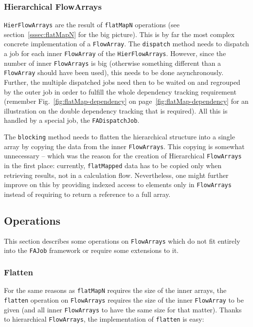 \documentclass[runningheads,a4paper,fleqn]{llncs}
\begin{document}
\subsubsection{Hierarchical FlowArrays}
\texttt{HierFlowArrays} are the result of \texttt{flatMapN} operations
(see section~\ref{sssec:flatMapN} for the big picture). This is by far
the most complex concrete implementation of a \texttt{FlowArray}. The
\texttt{dispatch} method needs to dispatch a job for each inner
\texttt{FlowArray} of the \texttt{HierFlowArrays}. However, since the number of
inner \texttt{FlowArrays} is big (otherwise something different than a \texttt{FlowArray}
should have been used), 
this needs to be done asynchronously. Further, the multiple dispatched
jobs need then to be waited on and regrouped by the outer job in order
to fulfill the whole dependency tracking requirement (remember
Fig.~\ref{fig:flatMap-dependency} on
page~\ref{fig:flatMap-dependency} for an illustration on the
double dependency tracking that is required). All this is handled by a 
special job, the \texttt{FADispatchJob}.

The \texttt{blocking} method needs to flatten the hierarchical
structure into a single array by copying the data from the inner
\texttt{FlowArrays}. This copying is somewhat unnecessary -- which 
was the reason for the creation of Hierarchical \texttt{FlowArrays} in the
first place: currently, \texttt{flatMapped} data has to be copied only when
retrieving results, not in a calculation flow. Nevertheless, one might
further improve on this by providing indexed access to elements only
in \texttt{FlowArrays} instead of requiring to return a reference to a full
array.

\subsection{Operations}
\label{ssec:imp-operations}
This section describes some operations on \texttt{FlowArrays} which do not fit
entirely into the \texttt{FAJob} framework or require some extensions
to it.

\subsubsection{Flatten}
For the same reasons as \texttt{flatMapN} requires the size of the
inner arrays, the \texttt{flatten} operation on \texttt{FlowArrays} requires
the size of the inner \texttt{FlowArray} to be given (and all inner \texttt{FlowArrays}
to have the same size for that matter). Thanks to hierarchical
\texttt{FlowArrays}, the implementation of \texttt{flatten} is easy:
\end{document}
